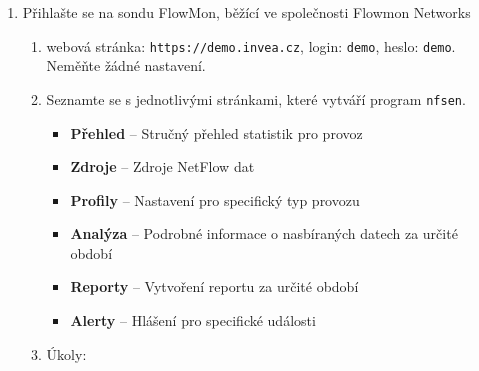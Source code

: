 \begin{itemize}
\begin{enumerate}
\begin{enumerate}
\begin{itemize}
                        \end{itemize}
                    \item Zjistěte, jak velké datové přenosy připadají na jednotlivé protokoly. (Statistika protokolů)
                        \begin{itemize}
                            \item Všimněte si rozdílů v podílech podle toků a podle přenesených bajtů.
                        \end{itemize}
                    \item Na základě získaných statistik se zamyslete nad velikostí sítě.
                    \item Vyfiltrujte si toky se zdrojovou IP 162.35.0.190. Zaměřte se na čísla portů.
                    Je aktivita zdroje něčím podezřelá?\footnote{Velké množství krátkých toků se
                     stejným cílem a postupně stoupajícími čísly portů ukazuje na vertikální skenování.}
                \end{enumerate}
        \item Přihlašte se na sondu FlowMon, běžící ve společnosti Flowmon Networks
            \begin{enumerate}
                \item webová stránka: {\tt https://demo.invea.cz}, login: {\tt demo}, heslo: {\tt demo}.
                      Neměňte žádné nastavení.
                \item Seznamte se s jednotlivými stránkami, které vytváří program {\tt nfsen}.
                   \begin{itemize}
                     \item {\bf Přehled} -- Stručný přehled statistik pro provoz
                     \item {\bf Zdroje} -- Zdroje NetFlow dat 
                     \item {\bf Profily} -- Nastavení pro specifický typ provozu 
                     \item {\bf Analýza} -- Podrobné informace o nasbíraných datech za určité období
                     \item {\bf Reporty} -- Vytvoření reportu za určité období
                     \item {\bf Alerty} -- Hlášení pro specifické události
                   \end{itemize}
             \item Úkoly:
                \begin{itemize}

\end{itemize}
\end{enumerate}
\end{enumerate}
\end{itemize}
